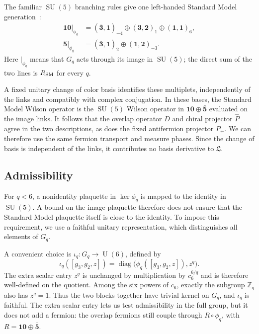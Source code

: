 \documentclass[11pt,a4paper]{article}
\theoremstyle{remark}
\DeclareMathOperator{\SU}{SU}
\DeclareMathOperator{\U}{U}
\begin{document}
The familiar $\SU(5)$ branching rules give one left-handed Standard
Model generation~\cite{GeorgiGlashow}:
\begin{equation}
 \begin{split}
 \mathbf{10}|_{\phi_q}
    &=(\bar{\mathbf3},\mathbf1)_{-4}\oplus(\mathbf3,\mathbf2)_1
      \oplus(\mathbf1,\mathbf1)_6,\\
 \bar{\mathbf5}|_{\phi_q}
    &=(\bar{\mathbf3},\mathbf1)_2\oplus(\mathbf1,\mathbf2)_{-3}.
 \end{split}
 \label{eq:sm-matter}
\end{equation}
Here $|_{\phi_q}$ means that $G_q$ acts through its image in $\SU(5)$;
the direct sum of the two lines is $R_{\rm SM}$ for every $q$.

A fixed unitary change of color basis identifies these multiplets,
independently of the links and compatibly with complex conjugation.
In these bases, the Standard Model Wilson operator is the $\SU(5)$
Wilson operator in $\mathbf{10}\oplus\bar{\mathbf5}$ evaluated on the
image links. It follows that the overlap operator $D$ and chiral
projector $\widehat P_-$ agree in the two descriptions, as does the fixed
antifermion projector $P_+$. We can therefore use the same fermion
transport and measure phases. Since the change of basis is independent
of the links, it contributes no basis derivative to $\mathfrak L$.

\subsection{Admissibility}

For $q<6$, a nonidentity plaquette in $\ker\phi_q$ is mapped to the
identity in $\SU(5)$. A bound on the image plaquette therefore does not
ensure that the Standard Model plaquette itself is close to the
identity. To impose this requirement, we use a faithful unitary
representation, which distinguishes all elements of $G_q$.

A convenient choice is $\iota_q:G_q\to\U(6)$, defined by
\begin{equation}
 \iota_q([g_3,g_2,z])
       =\operatorname{diag}\bigl(\phi_q([g_3,g_2,z]),z^q\bigr).
\end{equation}
The extra scalar entry $z^q$ is unchanged by multiplication by
$c_6^{6/q}$ and is therefore well-defined on the quotient. Among the
six powers of $c_6$, exactly the subgroup $\mathbb Z_q$ also has
$z^q=1$. Thus the two blocks together have trivial kernel on $G_q$,
and $\iota_q$ is faithful. The extra scalar entry lets us test
admissibility in the full group,
but it does not add a fermion: the overlap fermions still couple through
$R\circ\phi_q$, with $R=\mathbf{10}\oplus\bar{\mathbf5}$.
\end{document}

